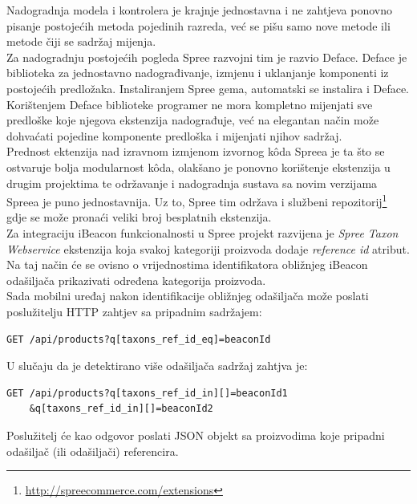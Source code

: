 Nadogradnja modela i kontrolera je krajnje jednostavna i ne zahtjeva ponovno pisanje postojećih metoda pojedinih razreda, već se pišu samo nove metode ili metode čiji se sadržaj mijenja.
\\
Za nadogradnju postojećih pogleda Spree razvojni tim je razvio Deface. 
Deface je biblioteka za jednostavno nadograđivanje, izmjenu i uklanjanje komponenti iz postojećih predložaka. 
Instaliranjem Spree gema, automatski se instalira i Deface. 
Korištenjem Deface biblioteke programer ne mora kompletno mijenjati sve predloške koje njegova ekstenzija nadograđuje, već na elegantan način može dohvaćati pojedine komponente predloška i mijenjati njihov sadržaj.
\\
Prednost ektenzija nad izravnom izmjenom izvornog kôda Spreea je ta što se ostvaruje bolja modularnost kôda, olakšano je ponovno korištenje ekstenzija u drugim projektima te održavanje i nadogradnja sustava sa novim verzijama Spreea je puno jednostavnija. 
Uz to, Spree tim održava i službeni repozitorij\footnote{\url{http://spreecommerce.com/extensions}} gdje se može pronaći veliki broj besplatnih ekstenzija.
\\

Za integraciju iBeacon funkcionalnosti u Spree projekt razvijena je \textit{Spree Taxon Webservice} ekstenzija koja svakoj kategoriji proizvoda dodaje \textit{reference id} atribut. 
Na taj način će se ovisno o vrijednostima identifikatora obližnjeg iBeacon odašiljača prikazivati određena kategorija proizvoda.
\\

Sada mobilni uređaj nakon identifikacije obližnjeg odašiljača može poslati poslužitelju HTTP zahtjev sa pripadnim sadržajem:
\begin{lstlisting}
GET /api/products?q[taxons_ref_id_eq]=beaconId
\end{lstlisting}

U slučaju da je detektirano više odašiljača sadržaj zahtjva je:
\begin{lstlisting}
GET /api/products?q[taxons_ref_id_in][]=beaconId1
	&q[taxons_ref_id_in][]=beaconId2
\end{lstlisting}

Poslužitelj će kao odgovor poslati JSON objekt sa proizvodima koje pripadni odašiljač (ili odašiljači) referencira.


